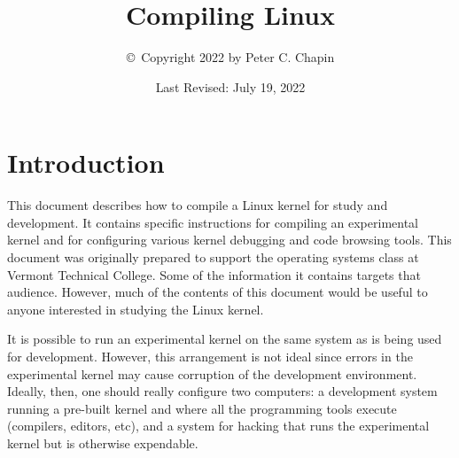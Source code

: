\documentclass{article}
\begin{document}
\title{Compiling Linux}
\author{\copyright\ Copyright 2022 by Peter C. Chapin}
\date{Last Revised: July 19, 2022}
\maketitle

\tableofcontents
\newpage
{}

%
%
%

\section{Introduction}

This document describes how to compile a Linux kernel for study and development. It contains
specific instructions for compiling an experimental kernel and for configuring various kernel
debugging and code browsing tools. This document was originally prepared to support the
operating systems class at Vermont Technical College. Some of the information it contains
targets that audience. However, much of the contents of this document would be useful to anyone
interested in studying the Linux kernel.

It is possible to run an experimental kernel on the same system as is being used for
development. However, this arrangement is not ideal since errors in the experimental kernel may
cause corruption of the development environment. Ideally, then, one should really configure two
computers: a development system running a pre-built kernel and where all the programming tools
execute (compilers, editors, etc), and a system for hacking that runs the experimental kernel
but is otherwise expendable.
\end{document}
